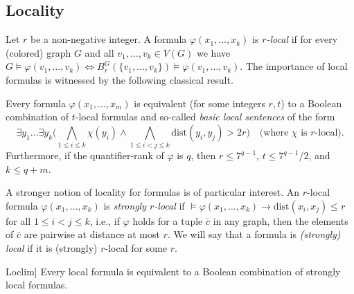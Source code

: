 \documentclass{lmcs}
\newcommand{\dist}{\mathrm{dist}}
\renewcommand{\phi}{\varphi}
\theoremstyle{definition}
\begin{document}
\subsection{Locality}
Let $r$ be a non-negative integer.  A formula $\phi(x_1,\ldots, x_k)$
is \emph{$r$-local} if for every \mbox{(colored)} graph $G$ and all
$v_1,\ldots, v_k\in V(G)$ we have
$G\models\phi(v_1,\ldots, v_k) \iff B_r^G(\{v_1,\ldots, v_k\})\models\phi(v_1,\ldots, v_k)$.
The importance of local formulas is witnessed by the following classical result.
\begin{lem}\label{lem:gaifman}
	\hfill\phantom{.}\linebreak
	Every formula 
	$\phi(x_1,\ldots, x_m)$ is equivalent (for some integers $r,t$) to a Boolean
	combination of $t$-local formulas 	and so-called \emph{basic local sentences} of the form
	\[\exists y_1\ldots\exists y_k \big(\bigwedge_{1\leq i\leq k}\chi(y_i)
	\wedge\bigwedge_{1\leq i<j\leq k}\dist(y_i,y_j)>2r\big)\quad 
	\text{(where $\chi$ is $r$-local).}\] 
	Furthermore, if the quantifier-rank of $\phi$ is $q$, then 
	$r\leq 7^{q-1}$, $t\leq 7^{q-1}/2$, and $k\leq q+m$. 
\end{lem}


A stronger notion of locality for formulas is of particular interest.
An $r$-local formula $\phi(x_1,\ldots, x_k)$ is \emph{strongly
	$r$-local} if
$\models\phi(x_1,\ldots,x_k)\rightarrow \dist(x_i,x_j)\leq r$ for all
$1\leq i<j\leq k$, i.e., if $\phi$ holds for a tuple $\bar{c}$ in any graph, then the elements of $\bar{c}$ are pairwise at distance at most $r$. We will say that a formula is {\em (strongly) local} if it is (strongly) $r$-local for some $r$.

\newcommand{\loclimref}{\cite[Theorem 2]{Loclim}}
\begin{lem}[follows from \loclimref]
	\label{lem:sl}
Every local formula is equivalent to a Boolean combination of strongly local formulas.
\end{lem}
\end{document}
